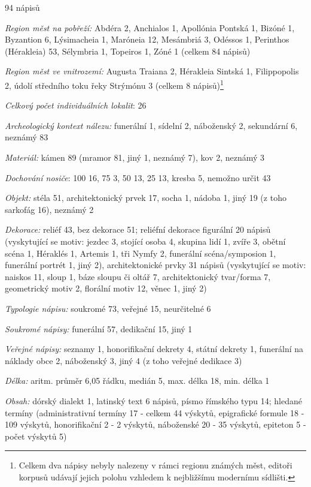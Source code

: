 \placetable[none]{}
\starttable[|l|]
\HL
{} 94 nápisů

{\em Region měst na pobřeží:} Abdéra 2, Anchialos 1, Apollónia Pontská 1, Bizóné 1, Byzantion 6, Lýsimacheia 1, Maróneia 12, Mesámbriá 3, Odéssos 1, Perinthos (Hérakleia) 53, Sélymbria 1, Topeiros 1, Zóné 1 (celkem 84 nápisů)

{\em Region měst ve vnitrozemí:} Augusta Traiana 2, Hérakleia Sintská 1, Filippopolis 2, údolí středního toku řeky Strýmónu 3 (celkem 8 nápisů)\footnote{Celkem dva nápisy nebyly nalezeny v rámci regionu známých měst, editoři korpusů udávají jejich polohu vzhledem k nejbližšímu modernímu sídlišti.}

{\em Celkový počet individuálních lokalit}: 26

{\em Archeologický kontext nálezu:} funerální 1, sídelní 2, náboženský 2, sekundární 6, neznámý 83

{\em Materiál:} kámen 89 (mramor 81, jiný 1, neznámý 7), kov 2, neznámý 3

{\em Dochování nosiče}: 100  16, 75  3, 50  13, 25  13, kresba 5, nemožno určit 43

{\em Objekt:} stéla 51, architektonický prvek 17, socha 1, nádoba 1, jiný 19 (z toho sarkofág 16), neznámý 2

{\em Dekorace:} reliéf 43, bez dekorace 51; reliéfní dekorace figurální 20 nápisů (vyskytující se motiv: jezdec 3, stojící osoba 4, skupina lidí 1, zvíře 3, obětní scéna 1, Héraklés 1, Artemis 1, tři Nymfy 2, funerální scéna/symposion 1, funerální portrét 1, jiný 2), architektonické prvky 31 nápisů (vyskytující se motiv: naiskos 11, sloup 1, báze sloupu či oltář 7, architektonický tvar/forma 7, geometrický motiv 2, florální motiv 12, věnec 1, jiný 2)

{\em Typologie nápisu:} soukromé 73, veřejné 15, neurčitelné 6

{\em Soukromé nápisy:} funerální 57, dedikační 15, jiný 1

{\em Veřejné nápisy:} seznamy 1, honorifikační dekrety 4, státní dekrety 1, funerální na náklady obce 2, náboženský 3, jiný 4 (z toho veřejné dedikace 3)

{\em Délka:} aritm. průměr 6,05 řádku, medián 5, max. délka 18, min. délka 1

{\em Obsah:} dórský dialekt 1, latinský text 6 nápisů, písmo římského typu 14; hledané termíny (administrativní termíny 17 - celkem 44 výskytů, epigrafické formule 18 - 109 výskytů, honorifikační 2 - 2 výskytů, náboženské 20 - 35 výskytů, epiteton 5 - počet výskytů 5)

